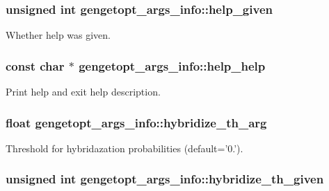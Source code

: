 \hypertarget{structgengetopt__args__info_ab9fd677f890731fd7d6f6c62e6dfc99c}{
\subsubsection[{help\+\_\+given}]{\setlength{\rightskip}{0pt plus 5cm}unsigned int gengetopt\+\_\+args\+\_\+info\+::help\+\_\+given}}\label{structgengetopt__args__info_ab9fd677f890731fd7d6f6c62e6dfc99c}


Whether help was given. 

\hypertarget{structgengetopt__args__info_a6497d9a5edee41da66eb109f093781a7}{
\subsubsection[{help\+\_\+help}]{\setlength{\rightskip}{0pt plus 5cm}const char $\ast$ gengetopt\+\_\+args\+\_\+info\+::help\+\_\+help}}\label{structgengetopt__args__info_a6497d9a5edee41da66eb109f093781a7}


Print help and exit help description. 

\hypertarget{structgengetopt__args__info_ae8618e9bfeb0de8e9b095ecec22af5c5}{
\subsubsection[{hybridize\+\_\+th\+\_\+arg}]{\setlength{\rightskip}{0pt plus 5cm}float gengetopt\+\_\+args\+\_\+info\+::hybridize\+\_\+th\+\_\+arg}}\label{structgengetopt__args__info_ae8618e9bfeb0de8e9b095ecec22af5c5}


Threshold for hybridazation probabilities (default='0.'). 

\hypertarget{structgengetopt__args__info_a8cfc0b8596b61b015d998df7255326a2}{
\subsubsection[{hybridize\+\_\+th\+\_\+given}]{\setlength{\rightskip}{0pt plus 5cm}unsigned int gengetopt\+\_\+args\+\_\+info\+::hybridize\+\_\+th\+\_\+given}}\label{structgengetopt__args__info_a8cfc0b8596b61b015d998df7255326a2}


